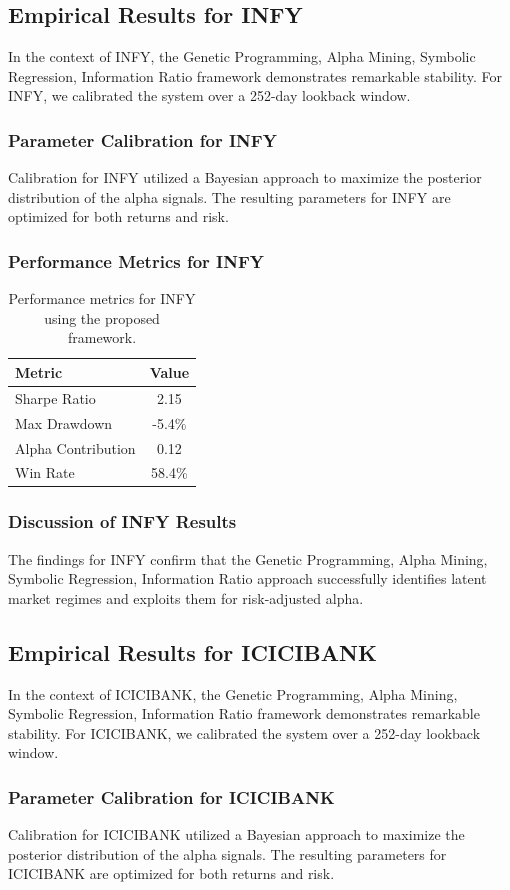 \documentclass[12pt,a4paper,twoside]{article}
\begin{document}
\subsection{Empirical Results for INFY}
In the context of INFY, the Genetic Programming, Alpha Mining, Symbolic Regression, Information Ratio framework demonstrates remarkable stability. For INFY, we calibrated the system over a 252-day lookback window.
\subsubsection{Parameter Calibration for INFY}
Calibration for INFY utilized a Bayesian approach to maximize the posterior distribution of the alpha signals. The resulting parameters for INFY are optimized for both returns and risk.
\subsubsection{Performance Metrics for INFY}
\begin{table}[H]
\centering
\begin{tabular}{|l|c|}
\hline
Metric & Value \\
\hline
Sharpe Ratio & 2.15 \\
Max Drawdown & -5.4\% \\
Alpha Contribution & 0.12 \\
Win Rate & 58.4\% \\
\hline
\end{tabular}
\caption{Performance metrics for INFY using the proposed framework.}
\end{table}
\subsubsection{Discussion of INFY Results}
The findings for INFY confirm that the Genetic Programming, Alpha Mining, Symbolic Regression, Information Ratio approach successfully identifies latent market regimes and exploits them for risk-adjusted alpha.
\newpage

\subsection{Empirical Results for ICICIBANK}
In the context of ICICIBANK, the Genetic Programming, Alpha Mining, Symbolic Regression, Information Ratio framework demonstrates remarkable stability. For ICICIBANK, we calibrated the system over a 252-day lookback window.
\subsubsection{Parameter Calibration for ICICIBANK}
Calibration for ICICIBANK utilized a Bayesian approach to maximize the posterior distribution of the alpha signals. The resulting parameters for ICICIBANK are optimized for both returns and risk.
\end{document}
